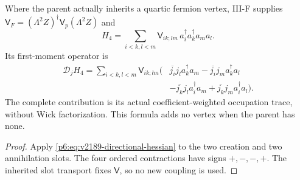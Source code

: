 \documentclass[12pt,a4paper]{article}
\begin{document}
\begin{corollary}
\label{p6:cor:v2189-quartic-first-moment}
Where the parent actually inherits a quartic fermion vertex, III-F supplies
$\mathsf V_F=(\Lambda^2Z)^\dagger\mathsf V_p(\Lambda^2Z)$ and
\[
 H_4=\sum_{i<k,l<m}\mathsf V_{ik;lm}\,
                 a_i^\dagger a_k^\dagger a_m a_l.
\]
Its first-moment operator is
\begin{align*}
 \mathcal D_jH_4=\sum_{i<k,l<m}\mathsf V_{ik;lm}\bigl(&
  \overline{j_i}j_l a_k^\dagger a_m
 -\overline{j_i}j_m a_k^\dagger a_l\\
 &-\overline{j_k}j_l a_i^\dagger a_m
 +\overline{j_k}j_m a_i^\dagger a_l\bigr).
\end{align*}
The complete contribution is its actual coefficient-weighted occupation
trace, without Wick factorization. This formula adds no vertex when the
parent has none.
\end{corollary}
\begin{proof}
Apply \eqref{p6:eq:v2189-directional-hessian} to the two creation and two
annihilation slots. The four ordered contractions have signs $+,-,-,+$.
The inherited slot transport fixes $\mathsf V$, so no new coupling is used.
\end{proof}
\end{document}
